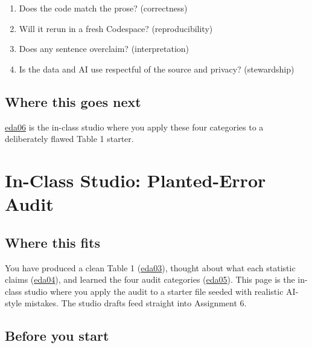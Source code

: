 \documentclass[
  letterpaper,
  DIV=11,
  numbers=noendperiod,
  oneside]{scrreprt}
\providecommand{\tightlist}{%
  \setlength{\itemsep}{0pt}\setlength{\parskip}{0pt}}
\begin{document}
\begin{enumerate}
\def\labelenumi{\arabic{enumi}.}
\tightlist
\item
  Does the code match the prose? (correctness)
\item
  Will it rerun in a fresh Codespace? (reproducibility)
\item
  Does any sentence overclaim? (interpretation)
\item
  Is the data and AI use respectful of the source and privacy?
  (stewardship)
\end{enumerate}

\section*{Where this goes next}\label{where-this-goes-next-11}


\href{eda06-studio-planted-errors.qmd}{eda06} is the in-class studio
where you apply these four categories to a deliberately flawed Table 1
starter.

\chapter*{In-Class Studio: Planted-Error
Audit}\label{in-class-studio-planted-error-audit}


\section*{Where this fits}\label{where-this-fits-10}


You have produced a clean Table 1
(\hyperref[worked-example-eda-and-table-1]{eda03}), thought about what
each statistic claims
(\hyperref[what-each-statistic-claims-and-does-not]{eda04}), and learned
the four audit categories
(\hyperref[four-audit-categories-for-ai-drafted-eda]{eda05}). This page
is the in-class studio where you apply the audit to a starter file
seeded with realistic AI-style mistakes. The studio drafts feed straight
into Assignment 6.

\section*{Before you start}\label{before-you-start-1}
\end{document}

